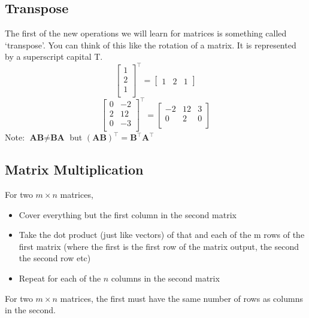 \documentclass[12pt] {article}
\begin{document}
\subsection*{Transpose}
The first of the new operations we will learn for matrices is something called `transpose'.
You can think of this like the rotation of a matrix. It is represented by a superscript capital T.
\begin{equation*}
  \begin{bmatrix} 
    1 \\
    2 \\
    1 \\
  \end{bmatrix} 
  ^\intercal
  =
  \begin{bmatrix}
    1 & 2 & 1 
  \end{bmatrix}
\end{equation*}
\begin{equation*}
  \begin{bmatrix} 
    0 & -2 \\
    2 & 12 \\
    0 & -3 \\
  \end{bmatrix} 
  ^\intercal
  =
  \begin{bmatrix} 
    -2 & 12 & 3 \\
     0 & 2 & 0 \\
  \end{bmatrix} 
\end{equation*}
Note: $\textbf{A}\textbf{B} \neq \textbf{B}\textbf{A}$ but $(\textbf{A}\textbf{B})^\intercal = \textbf{B}^\intercal \textbf{A}^\intercal$
\newpage

\subsection*{Matrix Multiplication}
For two $m \times n$ matrices, 
\begin{itemize}
  \item Cover everything but the first column in the second matrix
  \item Take the dot product (just like vectors) of that and each of the m rows of the first matrix (where the first is the first row of the matrix output, the second the second row etc)
  \item Repeat for each of the $n$ columns in the second matrix
\end{itemize}
For two $m \times n$ matrices, the first must have the same number of rows as columns in the
second. 
\end{document}
